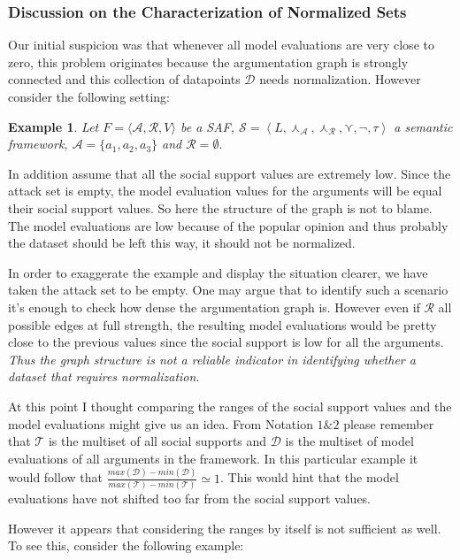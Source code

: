 \documentclass{article}
\newtheorem{example}{Example}
\newcommand{\args}{\mathcal{A}} %
\newcommand{\att}{\mathcal{R}}  %
\newcommand{\valueset}{L}
\newcommand{\safid}{F}               %
\newcommand{\saf}{\safid = \safbody} %
\newcommand{\safbody}{\langle \args, \att, V \rangle} %
\newcommand{\sembodyNew}{\left\langle \valueset,\SAFand_\mathcal{A}, \SAFand_\mathcal{R},\SAFor,\lnot,\tau \right\rangle} %
\newcommand{\SAFand}{\curlywedge}     %
\newcommand{\SAFor}{\curlyvee}        %
\newcommand{\sem}{\mathcal{S}}
\newcommand{\dataset}{\mathcal{D}}   %
\newcommand{\ssset}{\mathcal{T}}   %
\begin{document}
\subsubsection{Discussion on the Characterization of Normalized Sets}

Our initial suspicion was that whenever all model evaluations are very close to zero, this problem originates because the argumentation graph is strongly connected and this collection of datapoints $\dataset$ needs normalization. However consider the following setting:

\begin{example}
Let $\saf$ be a SAF, $\sem = \sembodyNew$ a semantic framework, $\args =\{a_1, a_2, a_3\}$ and $\att = \emptyset.$
\end{example}

In addition assume that all the social support values are extremely low. Since the attack set is empty, the model evaluation values for the arguments will be equal their social support values. So here the structure of the graph is not to blame. The model evaluations are low because of the popular opinion and thus probably the dataset should be left this way, it should not be normalized.
 
In order to exaggerate the example and display the situation clearer, we have taken the attack set to be empty. One may argue that to identify such a scenario it's enough to check how dense the argumentation graph is. However even if $\att$ all possible edges at full strength, the resulting model evaluations would be pretty close to the previous values since the social support is low for all the arguments. \emph{Thus the graph structure is not a reliable indicator in identifying whether a dataset that requires normalization.}

At this point I thought comparing the ranges of the social support values and the model evaluations might give us an idea. From Notation $1\&2$ please remember that $\ssset$ is the multiset of all social supports and $\dataset$  is the multiset of model evaluations of all arguments in the framework. In this particular example it would follow that  $\frac{max(\dataset) - min(\dataset)}{max(\ssset) - min(\ssset)} \simeq 1$. This would hint that the model evaluations have not shifted too far from the social support values. 

\vspace{3mm}
However it appears that considering the ranges by itself is not sufficient as well. To see this, consider the following example:
\end{document}
